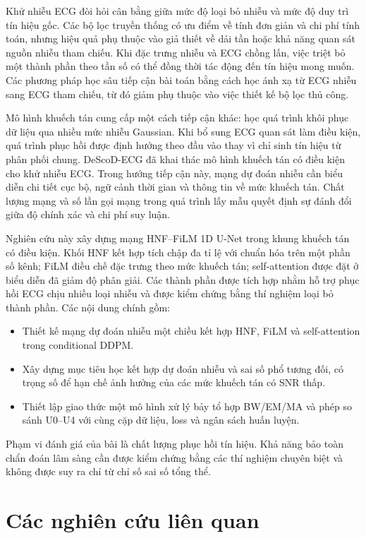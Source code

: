 \documentclass[conference]{IEEEtran}
\begin{document}
Khử nhiễu ECG đòi hỏi cân bằng giữa mức độ loại bỏ nhiễu và mức độ duy trì tín hiệu gốc. Các bộ lọc truyền thống có ưu điểm về tính đơn giản và chi phí tính toán, nhưng hiệu quả phụ thuộc vào giả thiết về dải tần hoặc khả năng quan sát nguồn nhiễu tham chiếu\cite{thakor1991}. Khi đặc trưng nhiễu và ECG chồng lấn, việc triệt bỏ một thành phần theo tần số có thể đồng thời tác động đến tín hiệu mong muốn. Các phương pháp học sâu tiếp cận bài toán bằng cách học ánh xạ từ ECG nhiễu sang ECG tham chiếu, từ đó giảm phụ thuộc vào việc thiết kế bộ lọc thủ công\cite{chiang2019,deepfilter,fgdae}.

Mô hình khuếch tán cung cấp một cách tiếp cận khác: học quá trình khôi phục dữ liệu qua nhiều mức nhiễu Gaussian\cite{ddpm}. Khi bổ sung ECG quan sát làm điều kiện, quá trình phục hồi được định hướng theo đầu vào thay vì chỉ sinh tín hiệu từ phân phối chung. DeScoD-ECG đã khai thác mô hình khuếch tán có điều kiện cho khử nhiễu ECG\cite{descod}. Trong hướng tiếp cận này, mạng dự đoán nhiễu cần biểu diễn chi tiết cục bộ, ngữ cảnh thời gian và thông tin về mức khuếch tán. Chất lượng mạng và số lần gọi mạng trong quá trình lấy mẫu quyết định sự đánh đổi giữa độ chính xác và chi phí suy luận.

Nghiên cứu này xây dựng mạng HNF--FiLM 1D U-Net trong khung khuếch tán có điều kiện. Khối HNF kết hợp tích chập đa tỉ lệ với chuẩn hóa trên một phần số kênh; FiLM điều chế đặc trưng theo mức khuếch tán; self-attention được đặt ở biểu diễn đã giảm độ phân giải. Các thành phần được tích hợp nhằm hỗ trợ phục hồi ECG chịu nhiều loại nhiễu và được kiểm chứng bằng thí nghiệm loại bỏ thành phần. Các nội dung chính gồm:
\begin{itemize}
 \item Thiết kế mạng dự đoán nhiễu một chiều kết hợp HNF, FiLM và self-attention trong conditional DDPM.
 \item Xây dựng mục tiêu học kết hợp dự đoán nhiễu và sai số phổ tương đối, có trọng số để hạn chế ảnh hưởng của các mức khuếch tán có SNR thấp.
 \item Thiết lập giao thức một mô hình xử lý bảy tổ hợp BW/EM/MA và phép so sánh U0--U4 với cùng cặp dữ liệu, loss và ngân sách huấn luyện.
\end{itemize}
Phạm vi đánh giá của bài là chất lượng phục hồi tín hiệu. Khả năng bảo toàn chẩn đoán lâm sàng cần được kiểm chứng bằng các thí nghiệm chuyên biệt và không được suy ra chỉ từ chỉ số sai số tổng thể.

\section{Các nghiên cứu liên quan}
\end{document}
